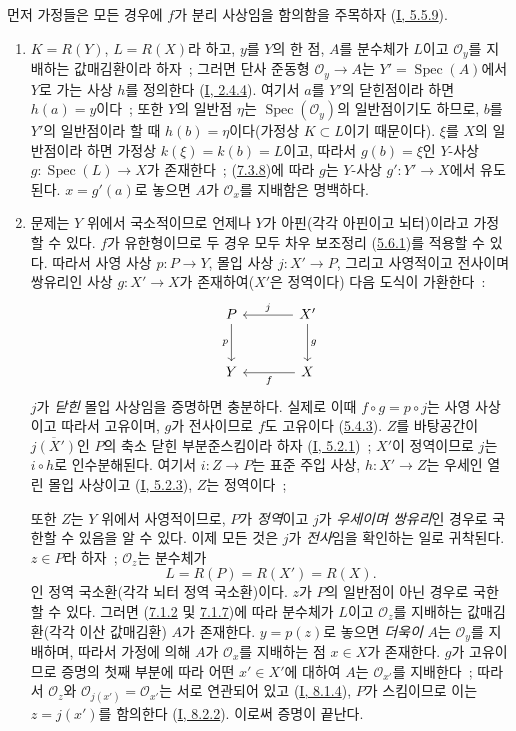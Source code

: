 먼저 가정들은 모든 경우에 $f$가 분리 사상임을 함의함을 주목하자
(\hyperref[I.5.5.9-ko]{I, 5.5.9}).
\begin{enumerate}
\item[\rm (i)] $K=R(Y)$, $L=R(X)$라 하고, $y$를 $Y$의 한 점,
$A$를 분수체가 $L$이고 $\mathcal{O}_y$를 지배하는 값매김환이라 하자~;
그러면 단사 준동형 $\mathcal{O}_y\to A$는 $Y'=\operatorname{Spec}(A)$에서
$Y$로 가는 사상 $h$를 정의한다
(\hyperref[I.2.4.4-ko]{I, 2.4.4}). 여기서 $a$를 $Y'$의 닫힌점이라 하면
$h(a)=y$이다~; 또한 $Y$의 일반점 $\eta$는
$\operatorname{Spec}(\mathcal{O}_y)$의 일반점이기도 하므로, $b$를
$Y'$의 일반점이라 할 때 $h(b)=\eta$이다(가정상 $K\subset L$이기
때문이다). $\xi$를 $X$의 일반점이라 하면 가정상
$k(\xi)=k(b)=L$이고, 따라서 $g(b)=\xi$인 $Y$-사상
$g:\operatorname{Spec}(L)\to X$가 존재한다~;
(\hyperref[II.7.3.8-ko]{7.3.8})에 따라 $g$는 $Y$-사상
$g':Y'\to X$에서 유도된다. $x=g'(a)$로 놓으면 $A$가
$\mathcal{O}_x$를 지배함은 명백하다.
\item[\rm (ii)] 문제는 $Y$ 위에서 국소적이므로 언제나 $Y$가
아핀(각각 아핀이고 뇌터)이라고 가정할 수 있다. $f$가 유한형이므로
두 경우 모두 차우 보조정리 (\hyperref[II.5.6.1-ko]{5.6.1})를 적용할
수 있다. 따라서 사영 사상 $p:P\to Y$, 몰입 사상 $j:X'\to P$, 그리고
사영적이고 전사이며 쌍유리인 사상 $g:X'\to X$가 존재하여($X'$은
정역이다) 다음 도식이 가환한다~:
\[
\begin{tikzcd}[column sep=large,row sep=large]
P \arrow[d,"p"'] & X' \arrow[l,"j"'] \arrow[d,"g"] \\
Y & X \arrow[l,"f"]
\end{tikzcd}
\]
$j$가 \emph{닫힌} 몰입 사상임을 증명하면 충분하다. 실제로 이때
$f\circ g=p\circ j$는 사영 사상이고 따라서 고유이며, $g$가
전사이므로 $f$도 고유이다
(\hyperref[II.5.4.3-ko]{5.4.3}). $Z$를 바탕공간이
$\overline{j(X')}$인 $P$의 축소 닫힌 부분준스킴이라 하자
(\hyperref[I.5.2.1-ko]{I, 5.2.1})~; $X'$이 정역이므로 $j$는
$i\circ h$로 인수분해된다. 여기서 $i:Z\to P$는 표준 주입 사상,
$h:X'\to Z$는 우세인 열린 몰입 사상이고
(\hyperref[I.5.2.3-ko]{I, 5.2.3}), $Z$는 정역이다~;

또한 $Z$는 $Y$ 위에서 사영적이므로, $P$가 \emph{정역}이고 $j$가
\emph{우세이며 쌍유리}인 경우로 국한할 수 있음을 알 수 있다. 이제
모든 것은 $j$가 \emph{전사}임을 확인하는 일로 귀착된다. $z\in P$라
하자~; $\mathcal{O}_z$는 분수체가
\[
L=R(P)=R(X')=R(X).
\]
인 정역 국소환(각각 뇌터 정역 국소환)이다. $z$가 $P$의 일반점이 아닌
경우로 국한할 수 있다. 그러면
(\hyperref[II.7.1.2-ko]{7.1.2} 및
\hyperref[II.7.1.7-ko]{7.1.7})에 따라 분수체가 $L$이고
$\mathcal{O}_z$를 지배하는 값매김환(각각 이산 값매김환) $A$가
존재한다. $y=p(z)$로 놓으면 \emph{더욱이} $A$는 $\mathcal{O}_y$를
지배하며, 따라서 가정에 의해 $A$가 $\mathcal{O}_x$를 지배하는 점
$x\in X$가 존재한다. $g$가 고유이므로 증명의 첫째 부분에 따라 어떤
$x'\in X'$에 대하여 $A$는 $\mathcal{O}_{x'}$를 지배한다~; 따라서
$\mathcal{O}_z$와 $\mathcal{O}_{j(x')}=\mathcal{O}_{x'}$는 서로
연관되어 있고 (\hyperref[I.8.1.4-ko]{I, 8.1.4}), $P$가 스킴이므로
이는 $z=j(x')$를 함의한다 (\hyperref[I.8.2.2-ko]{I, 8.2.2}). 이로써
증명이 끝난다.
\end{enumerate}

